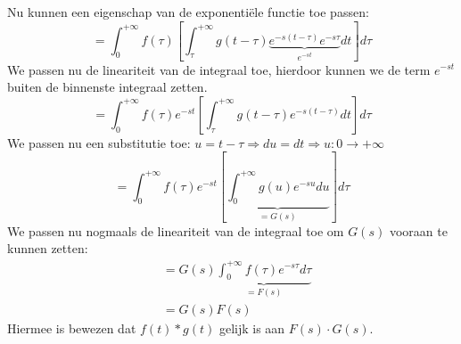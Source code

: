 \documentclass[]{subfiles}
\begin{document}
	Nu kunnen een eigenschap van de exponentiële functie toe passen:  
	\begin{equation}
		=\int_{0}^{+\infty}f(\tau)\left[ \int_{\tau}^{+\infty}g(t-\tau)\underbrace{e^{-s(t-\tau)}e^{-s\tau}}_{e^{-st}}dt\right]d\tau 
	\end{equation}
	We passen nu de lineariteit van de integraal toe, hierdoor kunnen we de term $e^{-st}$ buiten de binnenste integraal zetten. 
	\begin{equation}
		=\int_{0}^{+\infty}f(\tau)e^{-st}\left[ \int_{\tau}^{+\infty}g(t-\tau)e^{-s(t-\tau)}dt\right] d\tau
	\end{equation}%
	\newpage%
	We passen nu een substitutie toe: $u = t-\tau  \Rightarrow du = dt \Rightarrow u: 0\rightarrow+\infty$
	\begin{equation}
		=\int_{0}^{+\infty}f(\tau)e^{-st}\left[ \underbrace{\int_{0}^{+\infty}g(u)e^{-su}du}_{=G(s)}\right] d\tau
	\end{equation}
	We passen nu nogmaals de lineariteit van de integraal toe om $G(s)$ vooraan te kunnen zetten:
	\begin{align}
		&=G(s)\underbrace{\int_{0}^{+\infty}f(\tau)e^{-s\tau}d\tau}_{=F(s)}\\
		&=G(s)F(s)
	\end{align}
	Hiermee is bewezen dat $f(t)\ast g(t)$ gelijk is aan $F(s)\cdot G(s)$.
\end{document}
